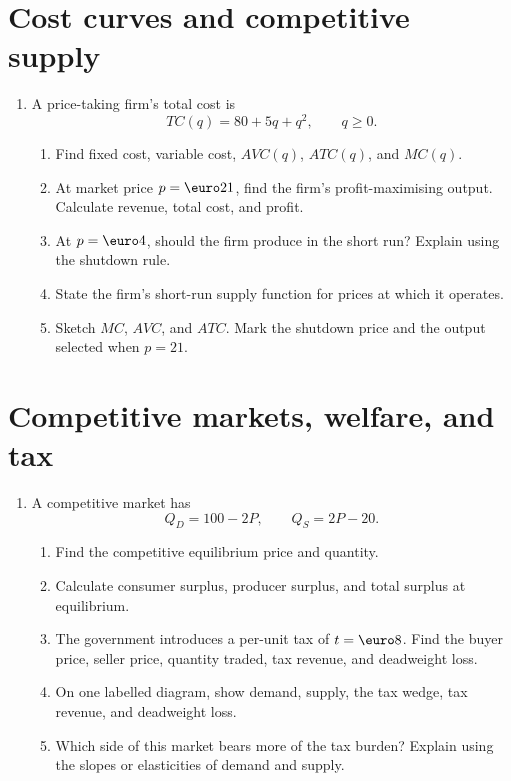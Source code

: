 \documentclass[11pt,a4paper]{article}
\begin{document}
\section{Cost curves and competitive supply}

\begin{enumerate}[label=\textbf{5.\alph*}]
  \item A price-taking firm's total cost is
  \[
    TC(q)=80+5q+q^2,
    \qquad q\geq0.
  \]
  \begin{enumerate}[label=(\roman*)]
    \item Find fixed cost, variable cost, \(AVC(q)\), \(ATC(q)\), and
    \(MC(q)\).
    \item At market price \(p=\text{\euro}21\), find the firm's profit-maximising
    output. Calculate revenue, total cost, and profit.
    \item At \(p=\text{\euro}4\), should the firm produce in the short run? Explain
    using the shutdown rule.
    \item State the firm's short-run supply function for prices at which it
    operates.
    \item Sketch \(MC\), \(AVC\), and \(ATC\). Mark the shutdown price and
    the output selected when \(p=21\).
  \end{enumerate}
\end{enumerate}

\section{Competitive markets, welfare, and tax}

\begin{enumerate}[label=\textbf{6.\alph*}]
  \item A competitive market has
  \[
    Q_D=100-2P,
    \qquad
    Q_S=2P-20.
  \]
  \begin{enumerate}[label=(\roman*)]
    \item Find the competitive equilibrium price and quantity.
    \item Calculate consumer surplus, producer surplus, and total surplus at
    equilibrium.
    \item The government introduces a per-unit tax of \(t=\text{\euro}8\). Find the
    buyer price, seller price, quantity traded, tax revenue, and deadweight
    loss.
    \item On one labelled diagram, show demand, supply, the tax wedge, tax
    revenue, and deadweight loss.
    \item Which side of this market bears more of the tax burden? Explain
    using the slopes or elasticities of demand and supply.
  \end{enumerate}
\end{enumerate}
\end{document}
